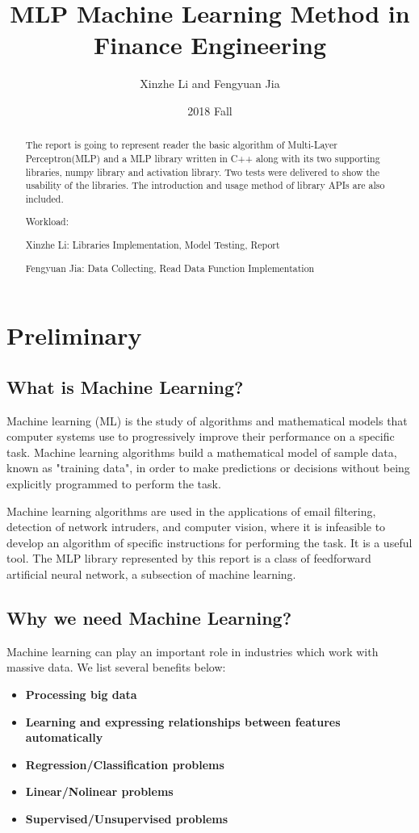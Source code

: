 \documentclass[a4paper]{article}
\title{MLP Machine Learning Method in Finance Engineering}
\author{Xinzhe Li and Fengyuan Jia}
\date{2018 Fall}
\begin{document}
\maketitle

\begin{abstract}
The report is going to represent reader the basic algorithm of Multi-Layer Perceptron(MLP) and a MLP library written in C++ along with its two supporting libraries, numpy library and activation library. Two tests were delivered to show the usability of the libraries. The introduction and usage method of library APIs are also included. 

Workload:

Xinzhe Li:   Libraries Implementation, Model Testing, Report

Fengyuan Jia:   Data Collecting, Read Data Function Implementation  
\end{abstract}

\section{Preliminary}
\label{sec:introduction}
\subsection{What is Machine Learning?}
Machine learning (ML) is the study of algorithms and mathematical models that computer systems use to progressively improve their performance on a specific task. Machine learning algorithms build a mathematical model of sample data, known as "training data", in order to make predictions or decisions without being explicitly programmed to perform the task.\cite{nano3}

Machine learning algorithms are used in the applications of email filtering, detection of network intruders, and computer vision, where it is infeasible to develop an algorithm of specific instructions for performing the task. It is a useful tool. The MLP library represented by this report is a class of feedforward artificial neural network, a subsection of machine learning. 
\subsection{Why we need Machine Learning?}

Machine learning can play an important role in industries which work with massive data. We list several benefits below:

\begin{itemize}
	\item{\textbf{Processing big data}}
    \item{\textbf{Learning and expressing relationships between features automatically} }
    \item{\textbf{Regression/Classification problems} }
    \item{\textbf{Linear/Nolinear problems} }
    \item{\textbf{Supervised/Unsupervised problems} }
\end{itemize}
\end{document}
